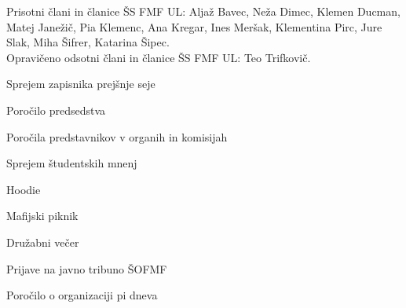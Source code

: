 \documentclass{seja}
\begin{document}
Prisotni člani in članice ŠS FMF UL:
Aljaž Bavec,
Neža Dimec,
Klemen Ducman,
Matej Janežič,
Pia Klemenc,
Ana Kregar,
Ines Meršak,
Klementina Pirc,
Jure Slak,
Miha Šifrer,
Katarina Šipec. \\
Opravičeno odsotni člani in članice ŠS FMF UL:
Teo Trifkovič.



\begin{red*}
  \item Sprejem zapisnika prejšnje seje
  \item Poročilo predsedstva
  \item Poročila predstavnikov v organih in komisijah
  \item Sprejem študentskih mnenj
  \item Hoodie
  \item Mafijski piknik
  \item Družabni večer
  \item Prijave na javno tribuno ŠOFMF
  \item Poročilo o organizaciji pi dneva
\end{red*}
\end{document}
